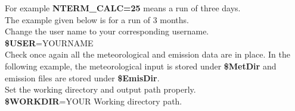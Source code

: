 For example \textbf{NTERM\_CALC=25} means a run of three days. \\

 The example given below is for a run of 3 months.  \\

 Change
the user name to your corresponding username. \\

\textbf{\$USER}=YOURNAME \\

Check once again all the meteorological and emission data are in
place. In the following example, the meteorological input is stored
under \textbf{\$MetDir} and emission files are stored under
\textbf{\$EmisDir}.  \\

 Set the working directory and output path properly.\\

\textbf{\$WORKDIR}=YOUR Working directory path.\\




